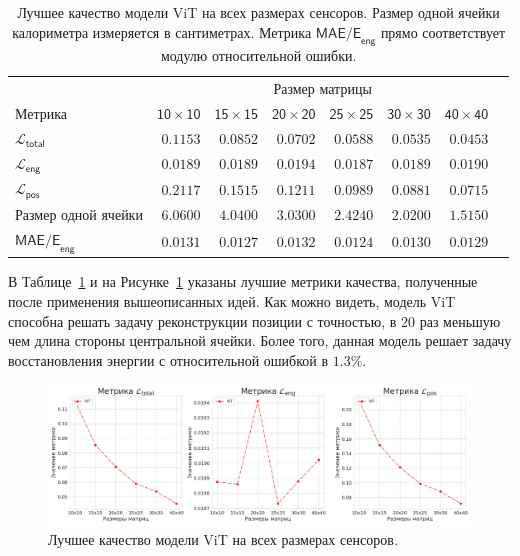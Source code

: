\documentclass[a4paper,12pt]{extarticle}
\begin{document}
\begin{table}[t]
	\footnotesize
	\centering
	\begin{tabular}{lrrrrrrr}
		\toprule
		{} & \multicolumn{6}{c}{\textsf{Размер матрицы}} \\
		\cmidrule(lr){2-7}
		\textsf{Метрика} & $\mathsf{10 \times 10}$ &  $\mathsf{15 \times 15}$ &  $\mathsf{20 \times 20}$ &  $\mathsf{25 \times 25}$ &  $\mathsf{30 \times 30}$ &  $\mathsf{40 \times 40}$ \\
        \midrule
        $\mathcal{L}_{\mathsf{total}}$ & $\mathsf{0.1153}$ & $\mathsf{0.0852}$ & $\mathsf{0.0702}$ & $\mathsf{0.0588}$ & $\mathsf{0.0535}$ & $\mathsf{0.0453}$ \\
        $\mathcal{L}_{\mathsf{eng}}$ & $\mathsf{0.0189}$ & $\mathsf{0.0189}$ & $\mathsf{0.0194}$ & $\mathsf{0.0187}$ & $\mathsf{0.0189}$ & $\mathsf{0.0190}$ \\
        $\mathcal{L}_{\mathsf{pos}}$ & $\mathsf{0.2117}$ & $\mathsf{0.1515}$ & $\mathsf{0.1211}$ & $\mathsf{0.0989}$ & $\mathsf{0.0881}$ & $\mathsf{0.0715}$ \\
        \textsf{Размер одной ячейки} & $\mathsf{6.0600}$ & $\mathsf{4.0400}$ & $\mathsf{3.0300}$ & $\mathsf{2.4240}$ & $\mathsf{2.0200}$ & $\mathsf{1.5150}$ \\
        $\textsf{MAE/E}_{\textsf{eng}}$ & $\mathsf{0.0131}$ & $\mathsf{0.0127}$ & $\mathsf{0.0132}$ & $\mathsf{0.0124}$ & $\mathsf{0.0130}$ & $\mathsf{0.0129}$ \\        
        \bottomrule
	\end{tabular}
    \caption{Лучшее качество модели \textsf{ViT} на всех размерах сенсоров. Размер одной ячейки калориметра измеряется в сантиметрах. Метрика $\textsf{MAE/E}_{\textsf{eng}}$ прямо соответствует модулю относительной ошибки.}
	\label{table:best_results}
\end{table}

В Таблице~\ref{table:best_results} и на Рисунке~\ref{graph:best_results} указаны лучшие метрики качества, полученные после применения вышеописанных идей. Как можно видеть, модель \textsf{ViT} способна решать задачу реконструкции позиции с точностью, в $20$ раз меньшую чем длина стороны центральной ячейки. Более того, данная модель решает задачу восстановления энергии с относительной ошибкой в $1.3\%$.

\begin{figure}[t]
    \centering
    \includegraphics[width=1.0\textwidth]{graphics/best_vit.png}
    \caption{Лучшее качество модели \textsf{ViT} на всех размерах сенсоров.}
    \label{graph:best_results}
\end{figure}
\end{document}
